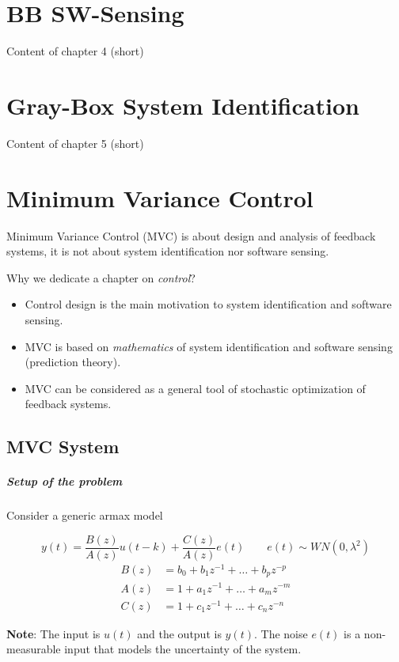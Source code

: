 
\chapter{BB SW-Sensing}
Content of chapter 4 (short)

\chapter{Gray-Box System Identification}
Content of chapter 5 (short)

\chapter{Minimum Variance Control}
Minimum Variance Control (MVC) is about design and analysis of feedback systems, it is not about system identification nor software sensing.

Why we dedicate a chapter on \emph{control}?
\begin{itemize}
    \item Control design is the main motivation to system identification and software sensing.
    \item MVC is based on \emph{mathematics} of system identification and software sensing (prediction theory).
    \item MVC can be considered as a general tool of stochastic optimization of feedback systems.
\end{itemize}

\section{MVC System}

\paragraph{Setup of the problem} Consider a generic \gls{armax} model

\begin{recall}
	\[
	    y(t) = \frac{B(z)}{A(z)}u(t-k) + \frac{C(z)}{A(z)}e(t) \qquad e(t) \sim WN(0, \lambda^2)
	\]
	\begin{align*}
	    B(z) &= b_0 + b_1z^{-1} + \dots + b_pz^{-p} \\
	    A(z) &= 1   + a_1z^{-1} + \dots + a_mz^{-m} \\
	    C(z) &= 1   + c_1z^{-1} + \dots + c_nz^{-n}
	\end{align*}

	\textbf{Note}: The input is $u(t)$ and the output is $y(t)$. The noise $e(t)$ is a non-measurable input that models the uncertainty of the system.  
\end{recall}

